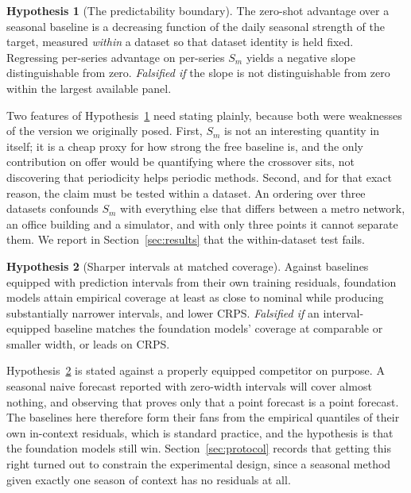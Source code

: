 \documentclass[11pt]{article}
\theoremstyle{plain}
\theoremstyle{definition}
\newtheorem{hypothesis}{Hypothesis}
\theoremstyle{remark}
\begin{document}
\begin{hypothesis}[The predictability boundary]
\label{hyp:boundary}
The zero-shot advantage over a seasonal baseline is a decreasing function of the daily seasonal strength of the target, measured \emph{within} a dataset so that dataset identity is held fixed. Regressing per-series advantage on per-series $S_m$ yields a negative slope distinguishable from zero.
\emph{Falsified if} the slope is not distinguishable from zero within the largest available panel.
\end{hypothesis}

Two features of Hypothesis~\ref{hyp:boundary} need stating plainly, because both were weaknesses of the version we originally posed. First, $S_m$ is not an interesting quantity in itself; it is a cheap proxy for how strong the free baseline is, and the only contribution on offer would be quantifying where the crossover sits, not discovering that periodicity helps periodic methods. Second, and for that exact reason, the claim must be tested within a dataset. An ordering over three datasets confounds $S_m$ with everything else that differs between a metro network, an office building and a simulator, and with only three points it cannot separate them. We report in Section~\ref{sec:results} that the within-dataset test fails.

\begin{hypothesis}[Sharper intervals at matched coverage]
\label{hyp:uncertainty}
Against baselines equipped with prediction intervals from their own training residuals, foundation models attain empirical coverage at least as close to nominal while producing substantially narrower intervals, and lower CRPS.
\emph{Falsified if} an interval-equipped baseline matches the foundation models' coverage at comparable or smaller width, or leads on CRPS.
\end{hypothesis}

Hypothesis~\ref{hyp:uncertainty} is stated against a properly equipped competitor on purpose. A seasonal naive forecast reported with zero-width intervals will cover almost nothing, and observing that proves only that a point forecast is a point forecast. The baselines here therefore form their fans from the empirical quantiles of their own in-context residuals, which is standard practice, and the hypothesis is that the foundation models still win. Section~\ref{sec:protocol} records that getting this right turned out to constrain the experimental design, since a seasonal method given exactly one season of context has no residuals at all.
\end{document}
